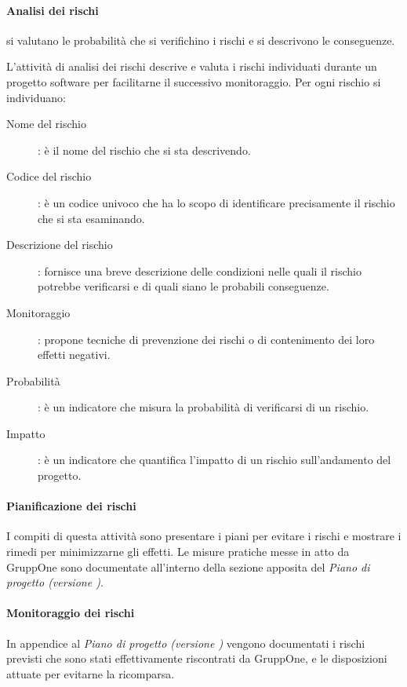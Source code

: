 \documentclass[../../norme-di-progetto.tex]{subfiles}
\begin{document}
\paragraph{Analisi dei rischi}%
\label{par:analisi__dei_rischi}

si valutano le probabilità che si verifichino i rischi e si descrivono le conseguenze.

L'attività di analisi dei rischi descrive e valuta i rischi individuati durante un progetto software per facilitarne il successivo monitoraggio. Per ogni rischio si individuano:
\begin{description}
  \item[Nome del rischio]: è il nome del rischio che si sta descrivendo.
  \item[Codice del rischio]: è un codice univoco che ha lo scopo di identificare precisamente il rischio che si sta esaminando.
  \item[Descrizione del rischio]: fornisce una breve descrizione delle condizioni nelle quali il rischio potrebbe verificarsi e di quali siano le probabili conseguenze.
  \item[Monitoraggio]: propone tecniche di prevenzione dei rischi o di contenimento dei loro effetti negativi.
  \item[Probabilità]: è un indicatore che misura la probabilità di verificarsi di un rischio.
  \item[Impatto]: è un indicatore che quantifica l'impatto di un rischio sull'andamento del progetto.
\end{description}

\paragraph{Pianificazione dei rischi}%
\label{par:pianificazione_dei_rischi}

I compiti di questa attività sono presentare i piani per evitare i rischi e mostrare i rimedi per minimizzarne gli effetti.
Le misure pratiche messe in atto da GruppOne sono documentate all'interno della sezione apposita del \textit{Piano di progetto (versione \versione)}.


\paragraph{Monitoraggio dei rischi}%
\label{par:monitoraggio_dei_rischi}

In appendice al \textit{Piano di progetto (versione \versione)} vengono documentati i rischi previsti che sono stati effettivamente riscontrati da GruppOne, e le disposizioni attuate per evitarne la ricomparsa.
\end{document}
